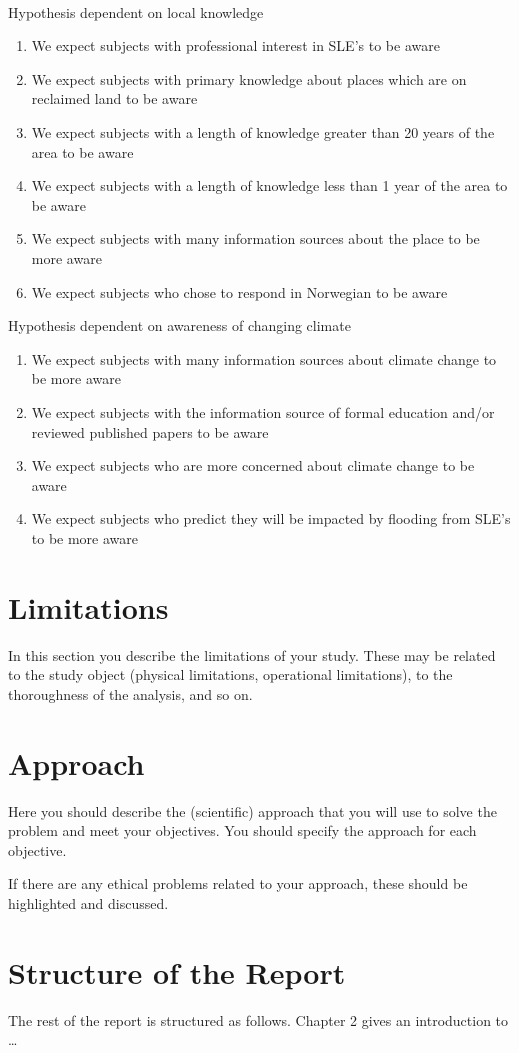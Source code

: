 \paragraph{}

Hypothesis dependent on local knowledge
\begin{enumerate}
    \item We expect subjects with professional interest in SLE's to be aware
    \item We expect subjects with primary knowledge about places which are on reclaimed land to be aware
    \item We expect subjects with a length of knowledge greater than 20 years of the area to be aware
    \item We expect subjects with a length of knowledge less than 1 year of the area to be aware
    \item We expect subjects with many information sources about the place to be more aware
    \item We expect subjects who chose to respond in Norwegian to be aware
\end{enumerate}

Hypothesis dependent on awareness of changing climate
\begin{enumerate}
    \item We expect subjects with many information sources about climate change to be more aware
    \item We expect subjects with the information source of formal education and/or reviewed published papers to be aware
    \item We expect subjects who are more concerned about climate change to be aware
    \item We expect subjects who predict they will be impacted by flooding from SLE's to be more aware
\end{enumerate}

\section{Limitations}
In this section you describe the limitations of your study. These may be related to the study object (physical limitations, operational limitations), to the thoroughness of the analysis, and so on.

%
\section{Approach}
Here you should describe the (scientific) approach that you will use to solve the problem and meet your objectives. You should specify the approach for each objective.

If there are any ethical problems related to your approach, these should be highlighted and discussed.
\section{Structure of the Report}
The rest of the report is structured as follows. Chapter 2 gives an introduction to \ldots
